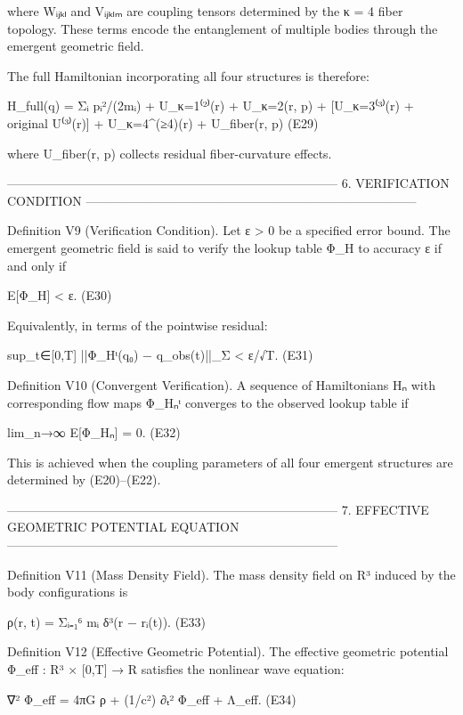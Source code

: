 where Wᵢⱼₖₗ and Vᵢⱼₖₗₘ are coupling tensors determined by the κ = 4
fiber topology. These terms encode the entanglement of multiple bodies
through the emergent geometric field.


The full Hamiltonian incorporating all four structures is therefore:

    H_{full}(q) = Σᵢ pᵢ²/(2mᵢ)
                + U_{κ=1}⁽²⁾(r)
                + U_{κ=2}(r, p)
                + [U_{κ=3}⁽³⁾(r) + original U⁽³⁾(r)]
                + U_{κ=4}^{(≥4)}(r)
                + U_{fiber}(r, p)                                   (E29)

where U_{fiber}(r, p) collects residual fiber-curvature effects.


--------------------------------------------------------------------------------
6. VERIFICATION CONDITION
--------------------------------------------------------------------------------

Definition V9 (Verification Condition).
Let ε > 0 be a specified error bound. The emergent geometric field is said
to verify the lookup table Φ_H to accuracy ε if and only if

    E[Φ_H] < ε.                                    (E30)

Equivalently, in terms of the pointwise residual:

    sup_{t∈[0,T]} ||Φ_Hᵗ(q₀) − q_obs(t)||_Σ < ε/√T.   (E31)

Definition V10 (Convergent Verification).
A sequence of Hamiltonians {Hₙ} with corresponding flow maps {Φ_{Hₙ}ᵗ}
converges to the observed lookup table if

    lim_{n→∞} E[Φ_{Hₙ}] = 0.                       (E32)

This is achieved when the coupling parameters of all four emergent
structures are determined by (E20)–(E22).


--------------------------------------------------------------------------------
7. EFFECTIVE GEOMETRIC POTENTIAL EQUATION
--------------------------------------------------------------------------------

Definition V11 (Mass Density Field).
The mass density field on R³ induced by the body configurations is

    ρ(r, t) = Σᵢ₌₁⁶ mᵢ δ³(r − rᵢ(t)).              (E33)


Definition V12 (Effective Geometric Potential).
The effective geometric potential Φ_eff : R³ × [0,T] → R satisfies the
nonlinear wave equation:

    ∇² Φ_eff = 4πG ρ + (1/c²) ∂ₜ² Φ_eff + Λ_eff.  (E34)

